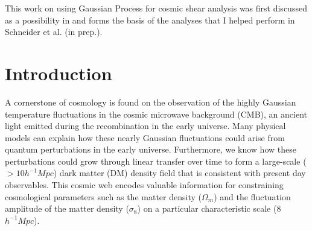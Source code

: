 
This work on using Gaussian Process for cosmic shear analysis 
was first discussed as a possibility in  \citep{Schneider2014}  and 
forms the basis of the analyses that I helped perform 
in Schneider et al. (in prep.). 

\section{Introduction} 

A cornerstone of cosmology is found on the 
observation of the highly Gaussian temperature fluctuations in the cosmic microwave 
background (CMB), an ancient light emitted during the recombination in the early
universe. Many physical models can explain how these
nearly Gaussian fluctuations could arise from quantum perturbations in the 
early universe. Furthermore, we know how these perturbations could grow
through linear transfer over time to form a large-scale ($> 10 h^{-1} Mpc$) 
dark matter (DM) density field that is consistent with present
day observables. 
This cosmic web encodes valuable information for constraining cosmological
parameters such as the matter density ($\Omega_m$) and the fluctuation amplitude 
of the matter density ($\sigma_8$) on a particular characteristic scale (8
$h^{-1} Mpc$). 


